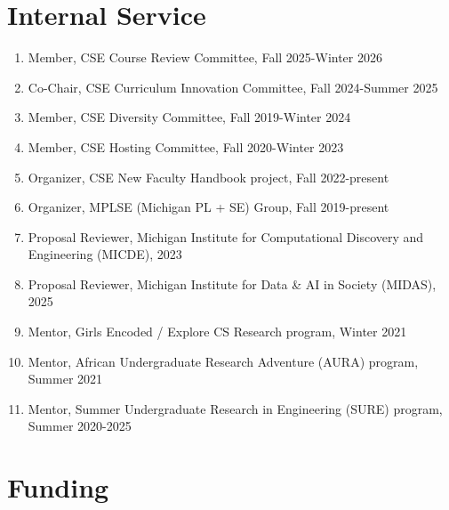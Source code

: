 \documentclass[10pt,letterpaper]{article}
\begin{document}
\section*{Internal Service}
\begin{enumerate}
  \item Member, CSE Course Review Committee, Fall 2025-Winter 2026
  \item Co-Chair, CSE Curriculum Innovation Committee, Fall 2024-Summer 2025
    
  \item Member, CSE Diversity Committee, Fall 2019-Winter 2024
  \item Member, CSE Hosting Committee, Fall 2020-Winter 2023
  \item Organizer, CSE New Faculty Handbook project, Fall 2022-present
  \item Organizer, MPLSE (Michigan PL + SE) Group, Fall 2019-present
  \item Proposal Reviewer, Michigan Institute for Computational Discovery and Engineering (MICDE), 2023
  \item Proposal Reviewer, Michigan Institute for Data \& AI in Society (MIDAS), 2025
  \item Mentor, Girls Encoded / Explore CS Research program, Winter 2021
  \item Mentor, African Undergraduate Research Adventure (AURA) program, Summer 2021
  \item Mentor, Summer Undergraduate Research in Engineering (SURE) program, Summer 2020-2025
\end{enumerate}


\section*{Funding}
\end{document}
